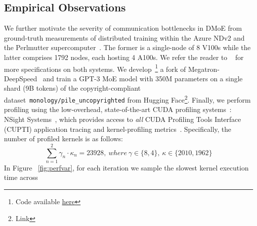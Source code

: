 \subsection{Empirical Observations}\label{subsec:empirical-observations}
We further motivate the severity of communication bottlenecks in DMoE from ground-truth measurements of distributed
training within the Azure NDv2 and the Perlmutter supercomputer~\cite{perlm}.
The former is a single-node of 8 V100s while the latter comprises 1792 nodes, each hosting 4 A100s.
We refer the reader to ~\cite{azure, perlm} for more specifications on both systems.
We develop~\footnote{Code available \href{https://github.com/osayamenja/Megatron-DeepSpeed}{here}}
a fork of Megatron-DeepSpeed~\cite{megatron-deepspeed}
and train a GPT-3 MoE model with 350M parameters on a single shard (9B tokens)
of the copyright-compliant dataset~\verb|monology/pile_uncopyrighted| from Hugging Face\footnote{Link}.
Finally, we perform profiling using the low-overhead,
state-of-the-art CUDA profiling systems~\cite{10.1145/3578244.3583736}:
NSight Systems~\cite{nsys}, which provides access to \emph{all} CUDA Profiling Tools Interface (CUPTI)
application tracing and kernel-profiling metrics~\cite{cupti}.
Specifically, the number of profiled kernels is as follows:
    {\footnotesize \[\sum_{n=1}^{2}\gamma_n \cdot \kappa_n = 23928, \> where\> \gamma \in \{8, 4\},\> \kappa \in \{2010, 1962\}\]}
In Figure ~\ref{fig:perfvar}, for each iteration we sample the slowest kernel execution time across
